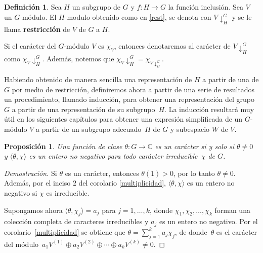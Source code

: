 \documentclass[12pt]{book}
\newtheorem{proposition}[theorem]{Proposición}
\theoremstyle{definition}
\newtheorem{definition}[theorem]{Definición}
\newcounter{in}
\newcounter{ini}
\begin{document}
\begin{definition}
  Sea $H$ un subgrupo de $G$ y $f:H\rightarrow G$ la función
  inclusión. Sea $V$ un $G$-módulo. El $H$-modulo obtenido como en \ref{rest}, se denota con $V\downarrow^{G}_{H}$ y se
  le llama \textbf{restricción} de $V$ de $G$ a $H$.
\end{definition}

Si el carácter del $G$-módulo $V$ es $\chi_{V}$, entonces
denotaremos al carácter de $V\downarrow^{G}_{H}$ como
$\chi_{V}\downarrow^{G}_{H}$. Además, notemos que
$\chi_{V}\downarrow^{G}_{H}=\chi_{V\downarrow^{G}_{H}}$.

Habiendo obtenido de manera sencilla una representación de $H$ a
partir de una de $G$ por medio de restricción, definiremos ahora a
partir de una serie de resultados un procedimiento, llamado inducción, para obtener una
representación del grupo $G$ a partir de una representación de su
subgrupo~$H$. La inducción resultará muy útil en los siguientes
capítulos para obtener una expresión simplificada de un $G$-módulo $V$
a partir de un subgrupo adecuado~$H$ de $G$ y subespacio $W$ de $V$.


\begin{proposition}
\label{fun-cla-caracter}
Una función de clase $\theta:G\rightarrow\mathbb{C}$ es un carácter si
y solo si $\theta\neq 0$ y $\langle\theta,\chi\rangle$ es un entero no
negativo para todo carácter irreducible~$\chi$ de $G$. 
\end{proposition}

\begin{proof}[Demostración]
Si $\theta$ es un carácter, entonces $\theta(1)>0$, por lo tanto
$\theta\neq 0$. Además, por el inciso $2$ del corolario
\ref{multiplicidad}, $\langle\theta,\chi\rangle$ es un entero no
negativo si $\chi$ es irreducible.

Supongamos ahora $\langle\theta,\chi_{j}\rangle=a_{j}$ para
$j=1,\ldots,k$, donde $\chi_{1},\chi_{2},\ldots,\chi_{k}$ forman una
colección completa de caracteres irreducibles y $a_{j}$ es un entero
no negativo. Por el corolario~\ref{multiplicidad} se obtiene que $\theta=\sum^{k}_{j=1}a_{j}\chi_{j}$, de donde~$\theta$ es el carácter del módulo~$a_{1}V^{(1)}\oplus
a_{2}V^{(2)}\oplus\cdots\oplus a_{k}V^{(k)}\neq 0$. 
\end{proof}
\end{document}
